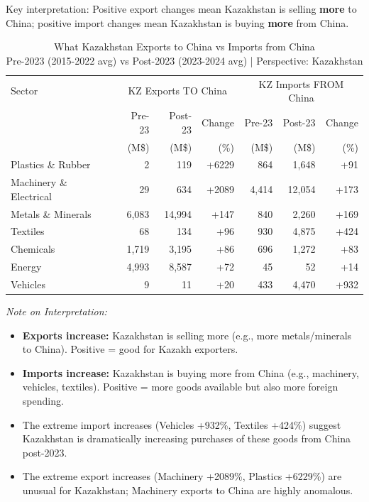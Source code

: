 \documentclass[12pt]{article}
\begin{document}
Key interpretation: Positive export changes mean Kazakhstan is selling \textbf{more} to China; positive import changes mean Kazakhstan is buying \textbf{more} from China.

\begin{table}[H]
\centering
\small
\caption{What Kazakhstan Exports to China vs Imports from China \\
Pre-2023 (2015-2022 avg) vs Post-2023 (2023-2024 avg) | Perspective: Kazakhstan}
\label{tab:sectoral_composition}
\begin{tabular}{lrrrrrr}
\toprule
Sector & \multicolumn{3}{c}{KZ Exports TO China} & \multicolumn{3}{c}{KZ Imports FROM China} \\
 & Pre-23 & Post-23 & Change & Pre-23 & Post-23 & Change \\
 & (M\$) & (M\$) & (\%) & (M\$) & (M\$) & (\%) \\
\midrule
Plastics \& Rubber & 2 & 119 & +6229 & 864 & 1,648 & +91 \\
Machinery \& Electrical & 29 & 634 & +2089 & 4,414 & 12,054 & +173 \\
Metals \& Minerals & 6,083 & 14,994 & +147 & 840 & 2,260 & +169 \\
Textiles & 68 & 134 & +96 & 930 & 4,875 & +424 \\
Chemicals & 1,719 & 3,195 & +86 & 696 & 1,272 & +83 \\
Energy & 4,993 & 8,587 & +72 & 45 & 52 & +14 \\
Vehicles & 9 & 11 & +20 & 433 & 4,470 & +932 \\
\bottomrule
\end{tabular}
\footnotesize
\emph{Note on Interpretation:} 
\begin{itemize}
\item \textbf{Exports increase:} Kazakhstan is selling more (e.g., more metals/minerals to China). Positive = good for Kazakh exporters.
\item \textbf{Imports increase:} Kazakhstan is buying more from China (e.g., machinery, vehicles, textiles). Positive = more goods available but also more foreign spending.
\item The extreme import increases (Vehicles +932\%, Textiles +424\%) suggest Kazakhstan is dramatically increasing purchases of these goods from China post-2023.
\item The extreme export increases (Machinery +2089\%, Plastics +6229\%) are unusual for Kazakhstan; Machinery exports to China are highly anomalous.
\end{itemize}
\end{table}
\end{document}
